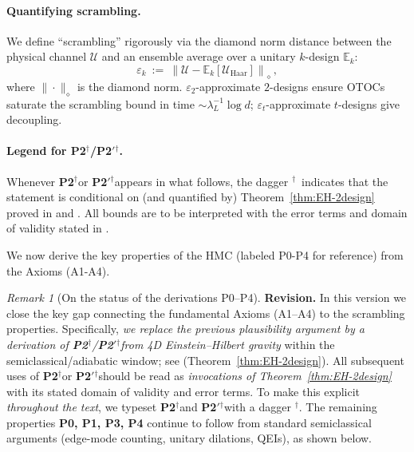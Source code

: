 \documentclass[a4paper,11pt]{article}
\newcommand{\condmark}{\ensuremath{^{\dagger}}}
\newcommand{\Ptwo}{\textbf{P2}\condmark}
\newcommand{\PtwoPrime}{\textbf{P2$'$}\condmark}
\newcommand{\HMC}{\textup{\textsc{HMC}}\xspace}
\theoremstyle{plain}
\theoremstyle{definition}
\theoremstyle{remark}
\newtheorem{remark}{Remark}
\begin{document}
\paragraph{Quantifying scrambling.}
We define ``scrambling'' rigorously via the diamond norm distance between the physical channel $\mathcal{U}$ and an ensemble average over a unitary $k$-design $\mathbb{E}_k$:
\begin{equation}
\varepsilon_k \ :=\ \left\|\mathcal{U} - \mathbb{E}_k[\mathcal{U}_{\text{Haar}}]\right\|_{\diamond}\,,
\end{equation}
where $\|\cdot\|_{\diamond}$ is the diamond norm. $\varepsilon_2$-approximate $2$-designs ensure OTOCs saturate the scrambling bound in time $\sim \lambda_L^{-1}\log d$; $\varepsilon_t$-approximate $t$-designs give decoupling.

\paragraph{Legend for \Ptwo/\PtwoPrime.}
Whenever \Ptwo or \PtwoPrime appears in what follows, the dagger \condmark\ indicates that the statement is conditional on (and quantified by) Theorem~\ref{thm:EH-2design} proved in  and .
All bounds are to be interpreted with the error terms and domain of validity stated in .

\label{sec:derivations_postulates}

\noindent
We now derive the key properties of the \HMC{} (labeled P0-P4 for reference) from the Axioms (A1-A4).


\begin{remark}[On the status of the derivations P0--P4]
\label{rem:status-derivations}
\textbf{Revision.} In this version we close the key gap connecting the fundamental Axioms (A1--A4) to the scrambling properties. 
Specifically, \emph{we replace the previous plausibility argument by a derivation of \Ptwo/\PtwoPrime from 4D Einstein--Hilbert gravity}
within the semiclassical/adiabatic window; see  (Theorem~\ref{thm:EH-2design}).
All subsequent uses of \Ptwo or \PtwoPrime should be read as \emph{invocations of Theorem~\ref{thm:EH-2design}} with its stated domain of validity and error terms. 
To make this explicit \emph{throughout the text}, we typeset \Ptwo and \PtwoPrime with a dagger \condmark. 
The remaining properties \textbf{P0, P1, P3, P4} continue to follow from standard semiclassical arguments (edge-mode counting, unitary dilations, QEIs), as shown below.
\end{remark}
\end{document}
